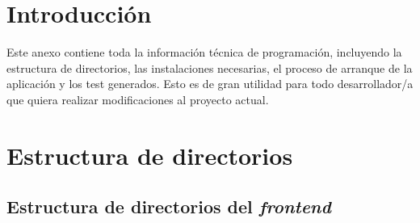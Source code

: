 
\section{Introducción}
Este anexo contiene toda la información técnica de programación, incluyendo la estructura de directorios, las instalaciones necesarias, el proceso de arranque de la aplicación y los test generados. Esto es de gran utilidad para todo desarrollador/a que quiera realizar modificaciones al proyecto actual.
\section{Estructura de directorios}
\subsection{Estructura de directorios del \textit{frontend}}

